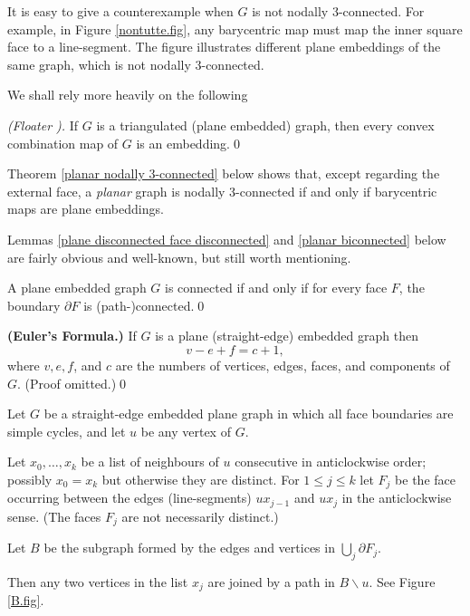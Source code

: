 It is easy to give a counterexample when $G$ is not
nodally 3-connected.  For example, in Figure \ref{nontutte.fig},
any barycentric map must map
the inner square face to a line-segment.  The figure
illustrates different plane embeddings of the same
graph, which is not nodally 3-connected.

We shall rely more heavily on the following

\begin{proposition}
\label{floaters theorem} {\em (Floater \cite{floater03}).}
If $G$ is a triangulated (plane embedded) graph, then every convex
combination map of $G$ is an embedding.\qed
\end{proposition}

Theorem \ref{planar nodally 3-connected} below shows that,
except regarding the external face, a {\em planar} graph
is nodally 3-connected if and only if barycentric maps
are plane embeddings.



Lemmas
\ref{plane disconnected face disconnected} and
\ref{planar biconnected} below are fairly obvious
and well-known, but still worth mentioning.

\begin{lemma}
\label{plane disconnected face disconnected} A plane embedded graph $G$ is
connected if and only if for every face $F$,
the boundary $\partial F$ is (path-)connected.\qed
\end{lemma}




\begin{proposition}
\label{eulers formula} {\bf (Euler's Formula.)}
If $G$ is a plane (straight-edge) embedded graph
then 
$$v-e+f = c+1,$$ where $v,e,f$, and $c$ are the
numbers of vertices, edges, faces, and components
of $G$. (Proof omitted.)\qed
\end{proposition}

\begin{lemma}
\label{link of u} Let $G$ be a straight-edge embedded plane graph in which all face boundaries
are simple cycles, and let $u$ be any vertex of $G$.

Let $x_0, \ldots , x_k$ be a list of neighbours of
$u$ consecutive in anticlockwise order; possibly $x_0 = x_k$
but otherwise they are distinct.  For $1 \leq j \leq k$
let $F_j$ be the face occurring between the edges (line-segments)
$u x_{j-1}$ and $u x_j$ in the anticlockwise sense.  (The
faces $F_j$ are not necessarily distinct.)

Let $B$ be the subgraph formed by the edges and vertices
in $\bigcup_j \partial F_j$.

Then any two vertices in the list $x_j$ are joined by a path in
$B \backslash u$. See Figure \ref{B.fig}.
\end{lemma}

